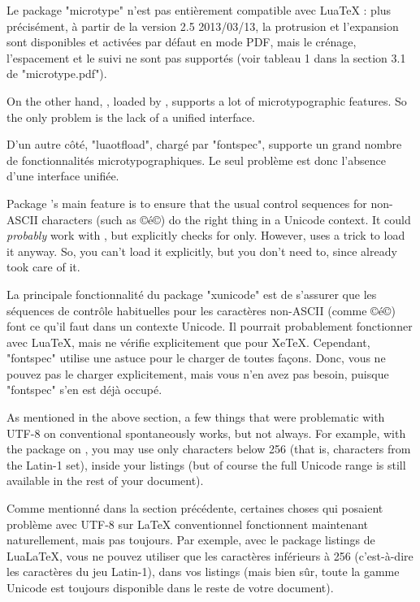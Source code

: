 \documentclass{lltxdoc}
\begin{document}
Le package "microtype" n'est pas entièrement compatible avec LuaTeX : plus précisément, à partir de la version 2.5 2013/03/13, la protrusion et l'expansion sont disponibles et activées par défaut en mode PDF, mais le crénage, l'espacement et le suivi ne sont pas supportés (voir tableau 1 dans la section 3.1 de "microtype.pdf").

On the other hand, , loaded by , supports a lot of
microtypographic features. So the only problem is the lack of a unified
interface.

D'un autre côté, "luaotfload", chargé par "fontspec", supporte un grand nombre de fonctionnalités microtypographiques. Le seul problème est donc l'absence d'une interface unifiée.

Package 's main feature is to ensure that the usual control
sequences for non-ASCII characters (such as ©\'e©) do the right thing in a
Unicode context. It could \emph{probably} work with \luatex, but explicitly
checks for \xetex only. However,  uses a trick to load it anyway.
So, you can't load it explicitly, but you don't need to, since 
already took care of it.

La principale fonctionnalité du package "xunicode" est de s'assurer que les séquences de contrôle habituelles pour les caractères non-ASCII (comme ©\'e©) font ce qu'il faut dans un contexte Unicode. Il pourrait probablement fonctionner avec LuaTeX, mais ne vérifie explicitement que pour XeTeX. Cependant, "fontspec" utilise une astuce pour le charger de toutes façons. Donc, vous ne pouvez pas le charger explicitement, mais vous n'en avez pas besoin, puisque "fontspec" s'en est déjà occupé.

As mentioned in the above section, a few things that were problematic with
UTF-8 on conventional \latex spontaneously works, but not always. For example,
with the  package on \lualatex, you may use only characters below
256 (that is, characters from the Latin-1 set), inside your listings (but of
course the full Unicode range is still available in the rest of your
document).

Comme mentionné dans la section précédente, certaines choses qui posaient problème avec UTF-8 sur LaTeX conventionnel fonctionnent maintenant naturellement, mais pas toujours. Par exemple, avec le package listings de LuaLaTeX, vous ne pouvez utiliser que les caractères inférieurs à 256 (c'est-à-dire les caractères du jeu Latin-1), dans vos listings (mais bien sûr, toute la gamme Unicode est toujours disponible dans le reste de votre document).
\end{document}
